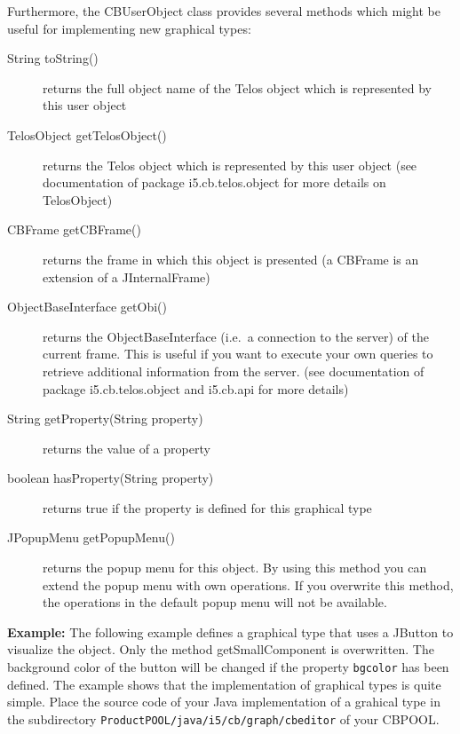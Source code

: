Furthermore, the CBUserObject class provides several methods which might be useful
for implementing new graphical types:

\begin{description}
\item[String toString()\\]
  returns the full object name of the Telos object which is represented by this user object

\item[TelosObject getTelosObject()\\]
  returns the Telos object which is represented by this user object (see documentation
  of package i5.cb.telos.object for more details on TelosObject)

\item[CBFrame getCBFrame()\\]
  returns the frame in which this object is presented (a CBFrame is an extension of a
  JInternalFrame)

\item[ObjectBaseInterface getObi()\\]
  returns the ObjectBaseInterface (i.e.\ a connection to the server) of the current
  frame. This is useful if you want to execute your own queries to retrieve additional
  information from the server.  (see documentation of package i5.cb.telos.object and i5.cb.api for more details)

\item[String getProperty(String property)\\]
  returns the value of a property

\item[boolean hasProperty(String property)\\]
  returns true if the property is defined for this graphical type

\item[JPopupMenu getPopupMenu()\\]
returns the popup menu for this object. By using this method
you can extend the popup menu with own operations. If you overwrite
this method, the operations in the default popup menu will not be
available.
\end{description}


{\bf Example:} The following example defines a graphical type that uses a
JButton to visualize the object. Only the method getSmallComponent is
overwritten. The background color of the button will be changed if the
property {\tt bgcolor} has been defined. The example shows that the
implementation of graphical types is quite simple.
Place the source code of your Java implementation of a grahical type in the
subdirectory {\tt ProductPOOL/java/i5/cb/graph/cbeditor} of your CBPOOL.

